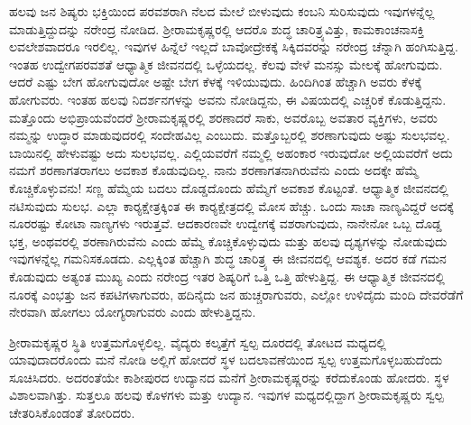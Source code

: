 ಹಲವು ಜನ ಶಿಷ್ಯರು ಭಕ್ತಿಯಿಂದ ಪರವಶರಾಗಿ ನೆಲದ ಮೇಲೆ ಬೀಳುವುದು ಕಂಬನಿ ಸುರಿಸುವುದು ಇವುಗಳನ್ನೆಲ್ಲ ಮಾಡುತ್ತಿದ್ದುದನ್ನು ನರೇಂದ್ರ ನೋಡಿದ. ಶ‍್ರೀರಾಮಕೃಷ್ಣರಲ್ಲಿ ಆದರೊ ಶುದ್ಧ ಚಾರಿತ್ರ್ಯವಿತ್ತು, ಕಾಮಕಾಂಚನಾಸಕ್ತಿ ಲವಲೇಶವಾದರೂ ಇರಲಿಲ್ಲ. ಇವುಗಳ ಹಿನ್ನೆಲೆ ಇಲ್ಲದೆ ಬಾವೋದ್ರೇಕಕ್ಕೆ ಸಿಕ್ಕಿದವರನ್ನು ನರೇಂದ್ರ ಚೆನ್ನಾಗಿ ಹಂಗಿಸುತ್ತಿದ್ದ. ಇಂತಹ ಉದ್ವೇಗಪರವಶತೆ ಆಧ್ಯಾತ್ಮಿಕ ಜೀವನದಲ್ಲಿ ಒಳ್ಳೆಯದಲ್ಲ. ಕೆಲವು ವೇಳೆ ಮನಸ್ಸು ಮೇಲಕ್ಕೆ ಹೋಗುವುದು. ಆದರೆ ಎಷ್ಟು ಬೇಗ ಹೋಗುವುದೋ ಅಷ್ಟೇ ಬೇಗ ಕೆಳಕ್ಕೆ ಇಳಿಯುವುದು. ಹಿಂದಿಗಿಂತ ಹೆಚ್ಚಾಗಿ ಅವರು ಕೆಳಕ್ಕೆ ಹೋಗುವರು. ಇಂತಹ ಹಲವು ನಿದರ್ಶನಗಳನ್ನು ಅವನು ನೋಡಿದ್ದನು, ಈ ವಿಷಯದಲ್ಲಿ ಎಚ್ಚರಿಕೆ ಕೊಡುತ್ತಿದ್ದನು. ಮತ್ತೊಂದು ಅಭಿಪ್ರಾಯವೆಂದರೆ ಶ‍್ರೀರಾಮಕೃಷ್ಣರಲ್ಲಿ ಶರಣಾದರೆ ಸಾಕು, ಅವರೊಬ್ಬ ಅವತಾರ ವ್ಯಕ್ತಿಗಳು, ಅವರು ನಮ್ಮನ್ನು ಉದ್ಧಾರ ಮಾಡುವುದರಲ್ಲಿ ಸಂದೇಹವಿಲ್ಲ ಎಂಬುದು. ಮತ್ತೊಬ್ಬರಲ್ಲಿ ಶರಣಾಗುವುದು ಅಷ್ಟು ಸುಲಭವಲ್ಲ. ಬಾಯಿನಲ್ಲಿ ಹೇಳುವಷ್ಟು ಅದು ಸುಲಭವಲ್ಲ. ಎಲ್ಲಿಯವರೆಗೆ ನಮ್ಮಲ್ಲಿ ಅಹಂಕಾರ ಇರುವುದೋ ಅಲ್ಲಿಯವರೆಗೆ ಅದು ನಮಗೆ ಶರಣಾಗತರಾಗಲು ಅವಕಾಶ ಕೊಡುವುದಿಲ್ಲ. ನಾನು ಶರಣಾಗತನಾಗಿರುವೆನು ಎಂದು ಅದಕ್ಕೇ ಹೆಮ್ಮೆ ಕೊಚ್ಚಿಕೊಳ್ಳುವನು! ಸಣ್ಣ ಹೆಮ್ಮೆಯ ಬದಲು ದೊಡ್ಡದೊಂದು ಹೆಮ್ಮೆಗೆ ಅವಕಾಶ ಕೊಟ್ಟಂತೆ. ಆಧ್ಯಾತ್ಮಿಕ ಜೀವನದಲ್ಲಿ ನಟಿಸುವುದು ಸುಲಭ. ಎಲ್ಲಾ ಕಾರ‍್ಯಕ್ಷೇತ್ರಕ್ಕಿಂತ ಈ ಕಾರ‍್ಯಕ್ಷೇತ್ರದಲ್ಲಿ ಮೋಸ ಹೆಚ್ಚು. ಒಂದು ಸಾಚಾ ನಾಣ್ಯವಿದ್ದರೆ ಅದಕ್ಕೆ ನೂರರಷ್ಟು ಕೋಟಾ ನಾಣ್ಯಗಳು ಇರುತ್ತವೆ. ಆದಕಾರಣವೇ ಉದ್ವೇಗಕ್ಕೆ ವಶರಾಗುವುದು, ನಾನೇನೋ ಒಬ್ಬ ದೊಡ್ಡ ಭಕ್ತ, ಅಂಥವರಲ್ಲಿ ಶರಣಾಗಿರುವೆನು ಎಂದು ಹೆಮ್ಮೆ ಕೊಚ್ಚಿಕೊಳ್ಳುವುದು ಮತ್ತು ಹಲವು ದೃಶ್ಯಗಳನ್ನು ನೋಡುವುದು ಇವುಗಳನ್ನೆಲ್ಲ ಗಮನಿಸಕೂಡದು. ಎಲ್ಲಕ್ಕಿಂತ ಹೆಚ್ಚಾಗಿ ಶುದ್ಧ ಚಾರಿತ್ರ್ಯ ಈ ಜೀವನದಲ್ಲಿ ಆವಶ್ಯಕ. ಅದರ ಕಡೆ ಗಮನ ಕೊಡುವುದು ಅತ್ಯಂತ ಮುಖ್ಯ ಎಂದು ನರೇಂದ್ರ ಇತರ ಶಿಷ್ಯರಿಗೆ ಒತ್ತಿ ಒತ್ತಿ ಹೇಳುತ್ತಿದ್ದ. ಈ ಆಧ್ಯಾತ್ಮಿಕ ಜೀವನದಲ್ಲಿ ನೂರಕ್ಕೆ ಎಂಭತ್ತು ಜನ ಕಪಟಿಗಳಾಗುವರು, ಹದಿನೈದು ಜನ ಹುಚ್ಚರಾಗುವರು, ಎಲ್ಲೋ ಉಳಿದೈದು ಮಂದಿ ದೇವರೆಡೆಗೆ ನೇರವಾಗಿ ಹೋಗಲು ಯೋಗ್ಯರಾಗುವರು ಎಂದು ಹೇಳುತ್ತಿದ್ದನು.

ಶ‍್ರೀರಾಮಕೃಷ್ಣರ ಸ್ಥಿತಿ ಉತ್ತಮಗೊಳ್ಳಲಿಲ್ಲ. ವೈದ್ಯರು ಕಲ್ಕತ್ತೆಗೆ ಸ್ವಲ್ಪ ದೂರದಲ್ಲಿ ತೋಟದ ಮಧ್ಯದಲ್ಲಿ ಯಾವುದಾದರೊಂದು ಮನೆ ನೋಡಿ ಅಲ್ಲಿಗೆ ಹೋದರೆ ಸ್ಥಳ ಬದಲಾವಣೆಯಿಂದ ಸ್ವಲ್ಪ ಉತ್ತಮಗೊಳ್ಳಬಹುದೆಂದು ಸೂಚಿಸಿದರು. ಅದರಂತೆಯೇ ಕಾಶೀಪುರದ ಉದ್ಯಾನದ ಮನೆಗೆ ಶ‍್ರೀರಾಮಕೃಷ್ಣರನ್ನು ಕರೆದುಕೊಂಡು ಹೋದರು. ಸ್ಥಳ ವಿಶಾಲವಾಗಿತ್ತು. ಸುತ್ತಲೂ ಹಲವು ಕೊಳಗಳು ಮತ್ತು ಉದ್ಯಾನ. ಇವುಗಳ ಮಧ್ಯದಲ್ಲಿದ್ದಾಗ ಶ‍್ರೀರಾಮಕೃಷ್ಣರು ಸ್ವಲ್ಪ ಚೇತರಿಸಿಕೊಂಡಂತೆ ತೋರಿದರು.

